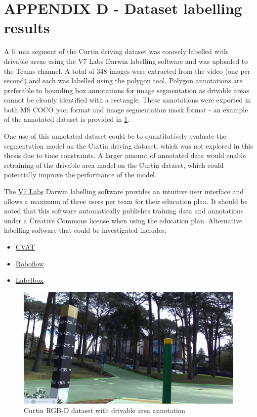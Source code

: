 \section*{APPENDIX D - Dataset labelling results}
A \SI{6}{\minute} segment of the Curtin driving dataset was coarsely labelled with drivable areas using
the V7 Labs Darwin labelling software and was uploaded to the Teams channel. A total of 348 images
were extracted from the video (one per second) and each was labelled using the polygon tool.
Polygon annotations are preferable to bounding box annotations for image segmentation
as drivable areas cannot be cleanly identified with a rectangle. These annotations
were exported in both MS COCO json format and image segmentation mask format - an example of
the annotated dataset is provided in \cref{fig:curtin_annotated}.

One use of this annotated dataset could be to quantitatively evaluate the segmentation model on
the Curtin driving dataset, which was not explored in this thesis due to time constraints.
A larger amount of annotated data would enable retraining of the drivable area model
on the Curtin dataset, which could potentially improve the performance of the model.

The \href{https://www.v7labs.com/}{\underline{V7 Labs}} Darwin labelling software provides an
intuitive user interface and allows a maximum of three users per team for their education plan.
It should be noted that this software automatically publishes training data and annotations under a Creative Commons
license when using the education plan. Alternative labelling software that
could be investigated includes:
\begin{itemize}
    \item \href{https://www.cvat.ai/}{\underline{CVAT}}
    \item \href{https://roboflow.com/}{\underline{Roboflow}}
    \item \href{https://labelbox.com/}{\underline{Labelbox}}
\end{itemize}

\begin{figure}[b]
    \centering
    \includegraphics[width=0.8\linewidth]{images/curtin_annotated.jpg}
    \caption{Curtin RGB-D dataset with drivable area annotation}
    \label{fig:curtin_annotated}
\end{figure}
